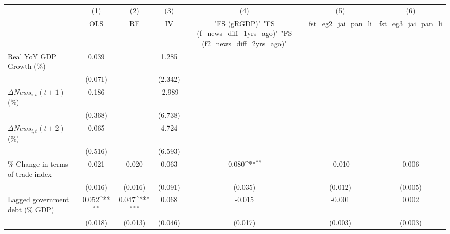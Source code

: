 {
\def\sym#1{\ifmmode^{#1}\else\(^{#1}\)\fi}
\begin{tabular}{l*{6}{c}}
\toprule
                    &\multicolumn{1}{c}{(1)}&\multicolumn{1}{c}{(2)}&\multicolumn{1}{c}{(3)}&\multicolumn{1}{c}{(4)}&\multicolumn{1}{c}{(5)}&\multicolumn{1}{c}{(6)}\\
                    &\multicolumn{1}{c}{OLS}&\multicolumn{1}{c}{RF}&\multicolumn{1}{c}{IV}&\multicolumn{1}{c}{ "FS (gRGDP)"  "FS (f_news_diff_1yrs_ago)"  "FS (f2_news_diff_2yrs_ago)" }&\multicolumn{1}{c}{fst_eg2_jai_pan_li}&\multicolumn{1}{c}{fst_eg3_jai_pan_li}\\
\midrule
Real YoY GDP Growth (\%)&       0.039         &                     &       1.285         &                     &                     &                     \\
                    &     (0.071)         &                     &     (2.342)         &                     &                     &                     \\
\addlinespace
$ \Delta News_{i,t}(t+1)$ (\%)&       0.186         &                     &      -2.989         &                     &                     &                     \\
                    &     (0.368)         &                     &     (6.738)         &                     &                     &                     \\
\addlinespace
$ \Delta News_{i,t}(t+2)$ (\%)&       0.065         &                     &       4.724         &                     &                     &                     \\
                    &     (0.516)         &                     &     (6.593)         &                     &                     &                     \\
\addlinespace
\% Change in terms-of-trade index&       0.021         &       0.020         &       0.063         &      -0.080\sym{**} &      -0.010         &       0.006         \\
                    &     (0.016)         &     (0.016)         &     (0.091)         &     (0.035)         &     (0.012)         &     (0.005)         \\
\addlinespace
Lagged government debt (\% GDP)&       0.052\sym{**} &       0.047\sym{***}&       0.068         &      -0.015         &      -0.001         &       0.002         \\
                    &     (0.018)         &     (0.013)         &     (0.046)         &     (0.017)         &     (0.003)         &     (0.003)         \\

\end{tabular}}
